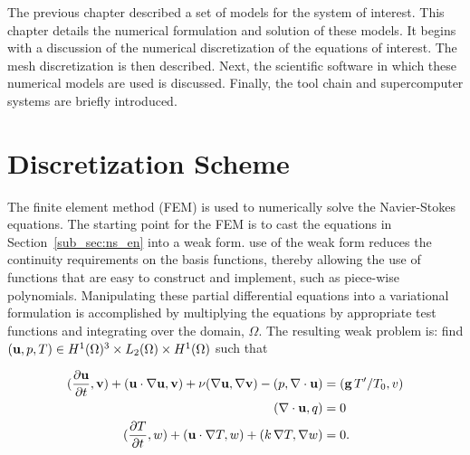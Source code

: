 \label{sec:software}

The previous chapter described a set of models 
for the system of interest. 
This chapter details the numerical formulation
and solution of these models. It begins with a 
discussion of the numerical discretization of the equations 
of interest. The mesh discretization is then described. 
Next, the scientific software in which these numerical 
models are used is discussed. Finally, the tool
chain and supercomputer systems are briefly introduced. 

\section{Discretization Scheme}
\label{sec:discretization}
The finite element method (FEM) is used to numerically solve the 
Navier-Stokes equations. The starting point for the FEM is
to cast the equations in Section~\ref{sub_sec:ns_en} into a weak
form. use of the weak form reduces the continuity requirements on the
basis functions, thereby allowing the use of functions that are
easy to construct and implement, such as piece-wise polynomials. 
Manipulating these partial differential equations into a
variational formulation is accomplished by multiplying the equations by
appropriate test functions and integrating over the domain,
$\Omega$. The resulting weak problem is: find $({\bf u},p,T) \in
H^1(\Omega)^3 \times L_2(\Omega) \times H^1(\Omega)$ such that 

%
%
\begin{align}
  (\frac{\partial{\bf u}}{\partial t},{\bf v}) + ({\bf u} \cdot \nabla{\bf
 u},{\bf v}) + \nu (\nabla{\bf u}, \nabla{\bf v})   
  -(p,\nabla \cdot{\bf u}) &= ({\bf g} \, T'/T_0,v)
 \label{eqn:ns_weak} \\
 (\nabla \cdot{\bf u},q) &= 0
 \label{eqn:cont_weak} \\
 (\frac{\partial T}{\partial t}, w) + ({\bf u} \cdot \nabla T,
 w) + (k \, \nabla T, \nabla  w) &= 0.\label{eqn:en_weak}
\end{align}


